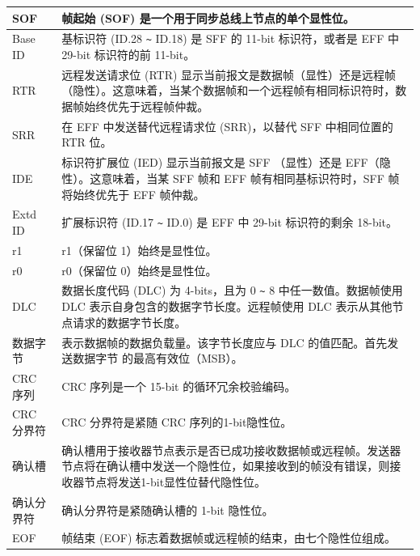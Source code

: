 \begin{longtable}[c]{|p{3.5cm}|p{12cm}|}
    SOF & 帧起始 (SOF) 是一个用于同步总线上节点的单个显性位。
          \\\hline
    Base ID & 基标识符 (ID.28 \verb+~+ ID.18) 是 SFF 的 11-bit 标识符，或者是 EFF 中 29-bit 标识符的前 11-bit。
          \\\hline
    RTR & 远程发送请求位 (RTR) 显示当前报文是数据帧（显性）还是远程帧（隐性）。这意味着，当某个数据帧和一个远程帧有相同标识符时，数据帧始终优先于远程帧仲裁。                                                    \\\hline
    SRR & 在 EFF 中发送替代远程请求位 (SRR)，以替代 SFF 中相同位置的 RTR 位。                       
           \\\hline
    IDE & 标识符扩展位 (IED) 显示当前报文是 SFF （显性）还是 EFF（隐性）。这意味着，当某 SFF 帧和 EFF 帧有相同基标识符时，SFF 帧将始终优先于 EFF 帧仲裁。              \\\hline
    Extd ID & 扩展标识符 (ID.17 \verb+~+ ID.0) 是 EFF 中 29-bit 标识符的剩余 18-bit。                                     \\\hline
    r1 & r1（保留位 1）始终是显性位。
             \\\hline 
    r0 & r0（保留位 0）始终是显性位。
             \\\hline
    DLC & 数据长度代码 (DLC) 为 4-bits，且为 0 \verb+~+ 8 中任一数值。数据帧使用 DLC 表示自身包含的数据字节长度。远程帧使用 DLC 表示从其他节点请求的数据字节长度。 
             \\\hline
    数据字节 & 表示数据帧的数据负载量。该字节长度应与 DLC 的值匹配。首先发送数据字节 的最高有效位（MSB）。
             \\\hline
    CRC 序列 & CRC 序列是一个 15-bit 的循环冗余校验编码。
             \\\hline
    CRC 分界符 & CRC 分界符是紧随 CRC 序列的1-bit隐性位。
              \\\hline
    确认槽 & 确认槽用于接收器节点表示是否已成功接收数据帧或远程帧。发送器节点将在确认槽中发送一个隐性位，如果接收到的帧没有错误，则接收器节点将发送1-bit显性位替代隐性位。
              \\\hline
    确认分界符 & 确认分界符是紧随确认槽的 1-bit 隐性位。
              \\\hline
    EOF & 帧结束 (EOF) 标志着数据帧或远程帧的结束，由七个隐性位组成。
              \\\hline
\end{longtable}
